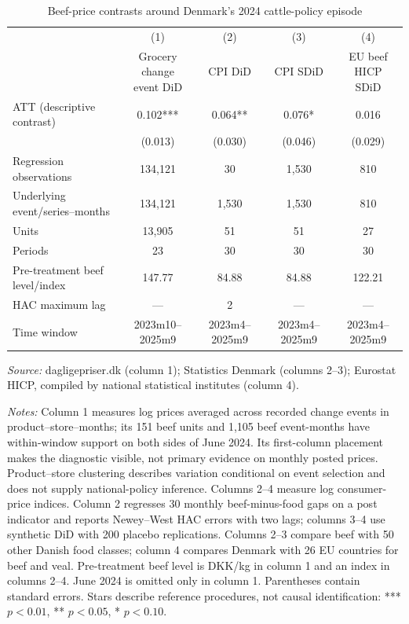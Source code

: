 \documentclass[11pt]{article}
\begin{document}
\begin{table}[htbp]
\centering\caption{Beef-price contrasts around Denmark's 2024 cattle-policy episode}\label{tab:main}
\footnotesize
\begin{tabular}{lcccc}\toprule
 & (1) & (2) & (3) & (4) \\
 & \shortstack{Grocery change\\event DiD} & CPI DiD & CPI SDiD & \shortstack{EU beef HICP\\SDiD} \\\midrule
ATT (descriptive contrast) & 0.102*** & 0.064** & 0.076* & 0.016 \\
 & (0.013) & (0.030) & (0.046) & (0.029) \\\midrule
Regression observations & 134,121 & 30 & 1,530 & 810 \\
Underlying event/series--months & 134,121 & 1,530 & 1,530 & 810 \\
Units & 13,905 & 51 & 51 & 27 \\
Periods & 23 & 30 & 30 & 30 \\
Pre-treatment beef level/index & 147.77 & 84.88 & 84.88 & 122.21 \\
HAC maximum lag & --- & 2 & --- & --- \\
Time window & 2023m10--2025m9 & 2023m4--2025m9 & 2023m4--2025m9 & 2023m4--2025m9 \\\bottomrule
\end{tabular}
\begin{minipage}{0.98\linewidth}\small
\textit{Source:} dagligepriser.dk (column 1); Statistics Denmark (columns 2--3); Eurostat HICP, compiled by national statistical institutes (column 4).\par
\textit{Notes:} Column 1 measures log prices averaged across recorded change events in product--store--months; its 151 beef units and 1,105 beef event-months have within-window support on both sides of June 2024. Its first-column placement makes the diagnostic visible, not primary evidence on monthly posted prices. Product--store clustering describes variation conditional on event selection and does not supply national-policy inference. Columns 2--4 measure log consumer-price indices. Column 2 regresses 30 monthly beef-minus-food gaps on a post indicator and reports Newey--West HAC errors with two lags; columns 3--4 use synthetic DiD with 200 placebo replications. Columns 2--3 compare beef with 50 other Danish food classes; column 4 compares Denmark with 26 EU countries for beef and veal. Pre-treatment beef level is DKK/kg in column 1 and an index in columns 2--4. June 2024 is omitted only in column 1. Parentheses contain standard errors. Stars describe reference procedures, not causal identification: *** $p<0.01$, ** $p<0.05$, * $p<0.10$.
\end{minipage}\end{table}
\end{document}
